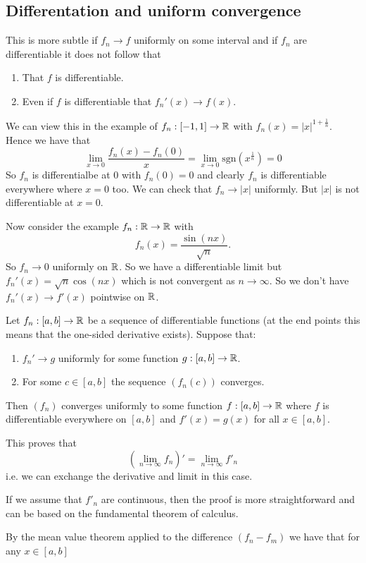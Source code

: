 \documentclass{article}
\begin{document}
\subsection{Differentation and uniform convergence}
This is more subtle if $ f_n\to f $ uniformly on some interval and if $ f_n $ are differentiable it does not follow that
\begin{enumerate}
	\item That $ f $ is differentiable.
	\item Even if $ f $ is differentiable that $ f_n'(x)\to f(x) $.
\end{enumerate}
We can view this in the example of $ f_n:[-1,1]\to \mathbb{R} $ with $ f_n(x)=|x|^{1+\frac 1n} $. Hence we have that 
\[
	\lim_{x\to 0}\frac{f_n(x)-f_n(0)}{x}=\lim_{x\to 0}\mathrm{sgn}(x^{\frac 1n})=0
\]
So $ f_n $ is differentialbe at $ 0 $ with $ f_n(0)=0 $ and clearly $ f_n $ is differentiable everywhere where $ x=0 $ too. We can check that $ f_n\to |x| $ uniformly. But $ |x| $ is not differentiable at $ x=0 $.\par
Now consider the example $ f_n:\mathbb{R}\to\mathbb{R} $ with
\[
	f_n(x)=\frac{\sin(nx)}{\sqrt n}.
\]
So $ f_n\to 0 $ uniformly on $ \mathbb{R} $. So we have a differentiable limit but $ f_n'(x)=\sqrt n \cos(nx) $ which is not convergent as $ n\to\infty $. So we don't have $ f_n'(x)\to f'(x) $ pointwise on $ \mathbb{R} $.
\begin{theorem}
	Let $ f_n:[a,b]\to \mathbb{R} $ be a sequence of differentiable functions (at the end points this means that the one-sided derivative exists). Suppose that:
	\smallskip\begin{enumerate}
		\item $ f_n'\to g $ uniformly for some function $ g:[a,b]\to \mathbb{R} $.
		\item For some $ c\in[a,b] $ the sequence $ (f_n(c)) $ converges.
	\end{enumerate}\smallskip
	Then $ (f_n) $ converges uniformly to some function $ f:[a,b]\to \mathbb{R} $ where $ f $ is differentiable everywhere on $ [a,b] $ and $ f'(x)=g(x) $ for all $ x\in[a,b] $.
\end{theorem}
This proves that
\[
	\left(\lim_{n\to \infty}f_n\right)'=\lim_{n\to\infty}f'_n
\]
i.e. we can exchange the derivative and limit in this case.
\begin{remark}
If we assume that $ f'_n $ are continuous, then the proof is more straightforward and can be based on the fundamental theorem of calculus. 
\end{remark}
\pf By the mean value theorem applied to the difference $ (f_n-f_m) $ we have that for any $ x\in[a,b] $
\end{document}
